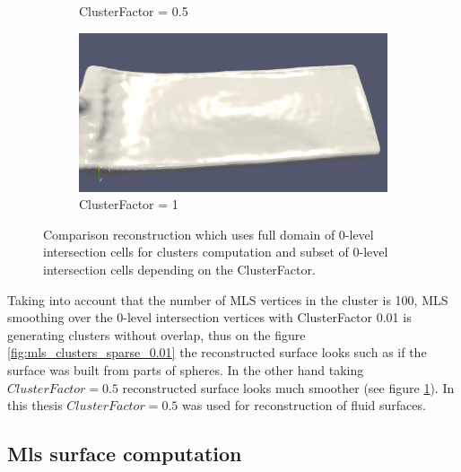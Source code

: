 \begin{figure}[H]
\begin{center}
\begin{subfigure}[b]{0.46\textwidth}
			\caption{ClusterFactor = 0.5} \label{fig:mls_clusters_sparse_0.5}
		\end{subfigure}
		\begin{subfigure}[b]{0.46\textwidth}
			\includegraphics[width=\textwidth]{figures/MlsSparseClusters1.png}
			\caption{ClusterFactor = 1} \label{fig:mls_clusters_sparse_1}
		\end{subfigure}

	\end{center}
	\caption{Comparison reconstruction which uses full domain of 0-level intersection cells for clusters computation and subset of 0-level intersection cells depending on the ClusterFactor.} \label{fig:mls_sparse_clusters_reconstruction}
\end{figure} 
Taking into account that the number of MLS vertices in the cluster is 100, MLS smoothing over the 0-level intersection vertices with ClusterFactor 0.01 is generating clusters without overlap, thus on the figure \ref{fig:mls_clusters_sparse_0.01} the reconstructed surface looks such as if the surface was built from parts of spheres. In the other hand taking $ClusterFactor = 0.5$ reconstructed surface looks much smoother (see figure \ref{fig:mls_clusters_sparse_0.5}). In this thesis $ClusterFactor = 0.5$ was used for reconstruction of fluid surfaces. 

\subsection{Mls surface computation}

